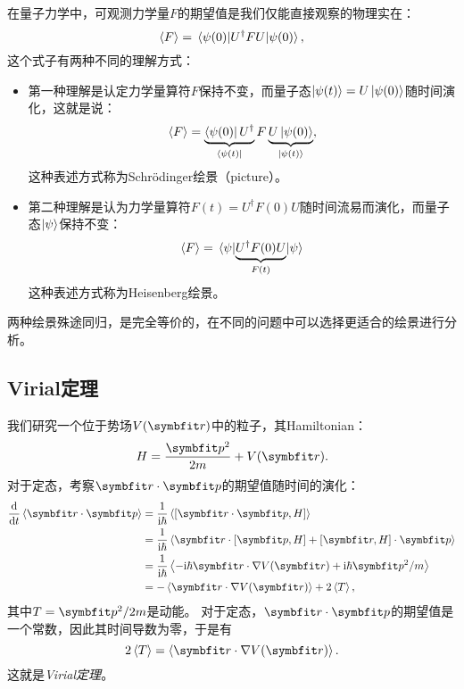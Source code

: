 在量子力学中，可观测力学量$F$的期望值是我们仅能直接观察的物理实在：
\begin{equation}
    \expval{F} = \mel{\psi(0)}{U^\dagger F U}{\psi(0)},
\end{equation}
这个式子有两种不同的理解方式：
\begin{itemize}
    \item 第一种理解是认定力学量算符$F$保持不变，而量子态$\ket{\psi(t)}=U\ket{\psi(0)}$随时间演化，这就是说：
        \begin{equation}
            \expval{F} = \underbrace{\bra{\psi(0)}U^\dagger}_{\bra{\psi(t)}} F \underbrace{U\ket{\psi(0)}}_{\ket{\psi(t)}},
        \end{equation}
        这种表述方式称为Schrödinger绘景（picture）。
    \item 第二种理解是认为力学量算符$F(t)=U^\dag F(0) U$随时间流易而演化，而量子态$\ket{\psi}$保持不变：
        \begin{equation}
            \expval{F} = \mel{\psi}{\underbrace{U^\dagger F(0) U}_{F(t)}}{\psi}
        \end{equation}
        这种表述方式称为Heisenberg绘景。
\end{itemize}
两种绘景殊途同归，是完全等价的，在不同的问题中可以选择更适合的绘景进行分析。


\subsection{Virial定理}

我们研究一个位于势场$V(\rr)$中的粒子，其Hamiltonian：
\begin{equation}
    H = \frac{\pp^2}{2m} + V(\rr).
\end{equation}
对于定态，考察$\rr\cdot\pp$的期望值随时间的演化：
\begin{equation}
\begin{aligned}
    \frac{\dd}{\dd t}\expval{\rr\cdot\pp}
    &= \frac{1}{\ii\hbar} \expval{[\rr\cdot\pp, H]} \\
    &= \frac{1}{\ii\hbar} \expval{\rr\cdot[\pp,H] + [\rr,H]\cdot\pp}\\
    &= \frac{1}{\ii\hbar} \expval{-\ii\hbar\rr\cdot\nabla V(\rr) + \ii\hbar\pp^2/m} \\
    &= -\expval{\rr\cdot\nabla V(\rr)} + 2\expval{T},
\end{aligned}
\end{equation}
其中$T=\pp^2/2m$是动能。
对于定态，$\rr\cdot\pp$的期望值是一个常数，因此其时间导数为零，于是有
\begin{equation}
    2\expval{T} = \expval{\rr\cdot\nabla V(\rr)}.
\end{equation}
这就是\emph{Virial定理}。

